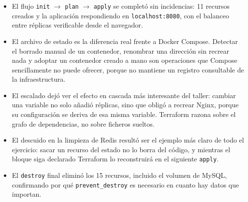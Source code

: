 \documentclass[11pt,a4paper]{article}
\begin{document}
\begin{itemize}
  \item El flujo \texttt{init} $\rightarrow$ \texttt{plan} $\rightarrow$
        \texttt{apply} se completó sin incidencias: 11 recursos creados y
        la aplicación respondiendo en \texttt{localhost:8080}, con el
        balanceo entre réplicas verificable desde el navegador.
  \item El archivo de estado es la diferencia real frente a Docker
        Compose. Detectar el borrado manual de un contenedor, renombrar
        una dirección sin recrear nada y adoptar un contenedor creado a
        mano son operaciones que Compose sencillamente no puede ofrecer,
        porque no mantiene un registro consultable de la infraestructura.
  \item El escalado dejó ver el efecto en cascada más interesante del
        taller: cambiar una variable no solo añadió réplicas, sino que
        obligó a recrear Nginx, porque su configuración se deriva de esa
        misma variable. Terraform razona sobre el grafo de dependencias,
        no sobre ficheros sueltos.
  \item El descuido en la limpieza de Redis resultó ser el ejemplo más
        claro de todo el ejercicio: sacar un recurso del estado no lo
        borra del código, y mientras el bloque siga declarado Terraform lo
        reconstruirá en el siguiente \texttt{apply}.
  \item El \texttt{destroy} final eliminó los 15 recursos, incluido el
        volumen de MySQL, confirmando por qué \texttt{prevent\_destroy} es
        necesario en cuanto hay datos que importan.
\end{itemize}
\end{document}
